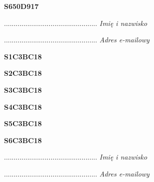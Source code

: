 \begin{turn}{90}\huge \textbf{S650D917}\end{turn}

\begin{turn}{90}\begin{minipage}{\linewidth} \vspace{20mm} ................................................  \textit{Imię i nazwisko}\end{minipage}\end{turn}

\begin{turn}{90}\begin{minipage}{\linewidth} \vspace{20mm} ................................................  \textit{Adres e-mailowy}\end{minipage}\end{turn}

\begin{turn}{90}\huge \textbf{S1C3BC18}\end{turn}

\begin{turn}{90}\huge \textbf{S2C3BC18}\end{turn}

\begin{turn}{90}\huge \textbf{S3C3BC18}\end{turn}

\begin{turn}{90}\huge \textbf{S4C3BC18}\end{turn}

\begin{turn}{90}\huge \textbf{S5C3BC18}\end{turn}

\begin{turn}{90}\huge \textbf{S6C3BC18}\end{turn}

\begin{turn}{90}\begin{minipage}{\linewidth} \vspace{20mm} ................................................  \textit{Imię i nazwisko}\end{minipage}\end{turn}

\begin{turn}{90}\begin{minipage}{\linewidth} \vspace{20mm} ................................................  \textit{Adres e-mailowy}\end{minipage}\end{turn}


